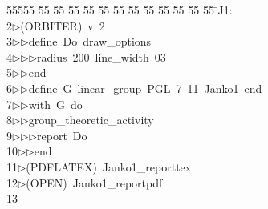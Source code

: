 %
%
\begin{tabbing}
55555 \= 55 \= 55 \= 55 \= 55 \= 55 \= 55 \= 55 \= 55 \= 55 \= 55 \= 55 \= 55 \= \>J1:\\[0pt]
2\>$\triangleright$\>(ORBITER)\ v\ 2\ \\[0pt]
3\>$\triangleright$\>$\triangleright$\>define\ Do\ draw\_options\ \\[0pt]
4\>$\triangleright$\>$\triangleright$\>$\triangleright$\>radius\ 200\ line\_width\ 03\ \\[0pt]
5\>$\triangleright$\>$\triangleright$\>end\ \\[0pt]
6\>$\triangleright$\>$\triangleright$\>define\ G\ linear\_group\ PGL\ 7\ 11\ Janko1\ end\ \\[0pt]
7\>$\triangleright$\>$\triangleright$\>with\ G\ do\ \\[0pt]
8\>$\triangleright$\>$\triangleright$\>group\_theoretic\_activity\ \\[0pt]
9\>$\triangleright$\>$\triangleright$\>$\triangleright$\>report\ Do\ \\[0pt]
10\>$\triangleright$\>$\triangleright$\>end\\[0pt]
11\>$\triangleright$\>(PDFLATEX)\ Janko1\_reporttex\\[0pt]
12\>$\triangleright$\>(OPEN)\ Janko1\_reportpdf\\[0pt]
13\>\end{tabbing}
